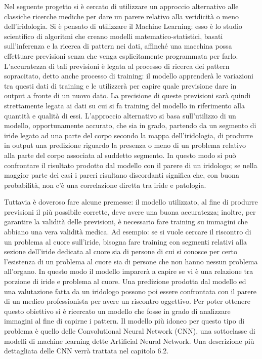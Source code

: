 Nel seguente progetto si è cercato di utilizzare un approccio alternativo alle classiche ricerche mediche per dare un parere relativo alla veridicità o meno dell’iridologia. Si è pensato di utilizzare il Machine Learning: esso è lo studio scientifico di algoritmi che creano modelli matematico-statistici, basati sull’inferenza e la ricerca di pattern nei dati, affinché una macchina possa effettuare previsioni senza che venga esplicitamente programmata per farlo. L’accuratezza di tali previsioni è legata al processo di ricerca dei pattern sopracitato, detto anche processo di training: il modello apprenderà le variazioni tra questi dati di training e le utilizzerà per capire quale previsione dare in output a fronte di un nuovo dato. La precisione di queste previsioni sarà quindi strettamente legata ai dati su cui si fa training del modello in riferimento alla quantità e qualità di essi. L’approccio alternativo si basa sull’utilizzo di un modello, opportunamente accurato, che sia in grado, partendo da un segmento di iride legato ad una parte del corpo secondo la mappa dell’iridologia, di produrre in output una predizione riguardo la presenza o meno di un problema relativo alla parte del corpo associata al suddetto segmento. In questo modo si può confrontare il risultato prodotto dal modello con il parere di un iridologo; se nella maggior parte dei casi i pareri risultano discordanti significa che, con buona probabilità, non c’è una correlazione diretta tra iride e patologia. 

Tuttavia è doveroso fare alcune premesse: il modello utilizzato, al fine di produrre previsioni il più possibile corrette, deve avere una buona accuratezza; inoltre, per garantire la validità delle previsioni, è necessario fare training su immagini che abbiano una vera validità medica. Ad esempio: se si vuole cercare il riscontro di un problema al cuore sull’iride, bisogna fare training con segmenti relativi alla sezione dell’iride dedicata al cuore sia di persone di cui si conosce per certo l’esistenza di un problema al cuore sia di persone che non hanno nessun problema all’organo. In questo modo il modello imparerà a capire se vi è una relazione tra porzione di iride e problema al cuore. Una predizione prodotta dal modello ed una valutazione fatta da un iridologo possono poi essere confrontata con il parere di un medico professionista per avere un riscontro oggettivo. Per poter ottenere questo obiettivo si è ricercato un modello che fosse in grado di analizzare immagini al fine di capirne i pattern. Il modello più idoneo per questo tipo di problema è quello delle Convolutional Neural Network (CNN), una sottoclasse di modelli di machine learning dette Artificial Neural Network. Una descrizione più dettagliata delle CNN verrà trattata nel capitolo 6.2.

